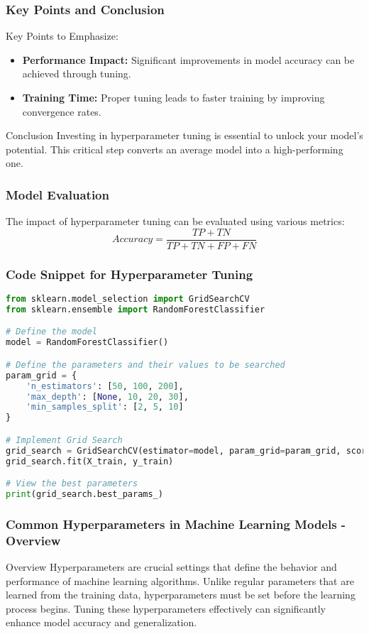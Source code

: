 \documentclass[aspectratio=169]{beamer}
\begin{document}
\begin{frame}[fragile]
    \frametitle{Key Points and Conclusion}
    \begin{block}{Key Points to Emphasize:}
        \begin{itemize}
            \item \textbf{Performance Impact:} Significant improvements in model accuracy can be achieved through tuning.
            \item \textbf{Training Time:} Proper tuning leads to faster training by improving convergence rates.
        \end{itemize}
    \end{block}
    \begin{block}{Conclusion}
        Investing in hyperparameter tuning is essential to unlock your model's potential. This critical step converts an average model into a high-performing one.
    \end{block}
\end{frame}

\begin{frame}[fragile]
    \frametitle{Model Evaluation}
    The impact of hyperparameter tuning can be evaluated using various metrics:
    \begin{equation}
        Accuracy = \frac{TP + TN}{TP + TN + FP + FN}
    \end{equation}
\end{frame}

\begin{frame}[fragile]
    \frametitle{Code Snippet for Hyperparameter Tuning}
    \begin{lstlisting}[language=Python]
from sklearn.model_selection import GridSearchCV
from sklearn.ensemble import RandomForestClassifier

# Define the model
model = RandomForestClassifier()

# Define the parameters and their values to be searched
param_grid = {
    'n_estimators': [50, 100, 200],
    'max_depth': [None, 10, 20, 30],
    'min_samples_split': [2, 5, 10]
}

# Implement Grid Search
grid_search = GridSearchCV(estimator=model, param_grid=param_grid, scoring='accuracy', cv=3)
grid_search.fit(X_train, y_train)

# View the best parameters
print(grid_search.best_params_)
    \end{lstlisting}
\end{frame}

\begin{frame}[fragile]
    \frametitle{Common Hyperparameters in Machine Learning Models - Overview}
    \begin{block}{Overview}
        Hyperparameters are crucial settings that define the behavior and performance of machine learning algorithms. 
        Unlike regular parameters that are learned from the training data, hyperparameters must be set 
        before the learning process begins. Tuning these hyperparameters effectively can significantly enhance 
        model accuracy and generalization.
    \end{block}
\end{frame}
\end{document}

